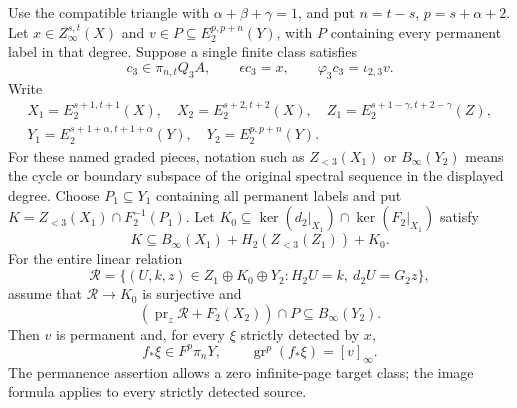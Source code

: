 \begin{corollary}
\label{sem:ProofTools:coverage-recursive-three-layer-permanent}
Use the compatible triangle with $\alpha+\beta+\gamma=1$, and put
$n=t-s$, $p=s+\alpha+2$.
Let $x\in Z_\infty^{s,t}(X)$ and
$v\in P\subseteq E_2^{p,p+n}(Y)$, with $P$ containing every
permanent label in that degree. Suppose a single finite class satisfies
\[
 c_3\in\pi_{n,t}Q_3A,\qquad \epsilon c_3=x,\qquad
 \varphi_3c_3=\iota_{2,3}v.
\]
Write
\[
\begin{gathered}
 X_1=E_2^{s+1,t+1}(X),\quad X_2=E_2^{s+2,t+2}(X),\quad
 Z_1=E_2^{s+1-\gamma,t+2-\gamma}(Z),\\
 Y_1=E_2^{s+1+\alpha,t+1+\alpha}(Y),\quad
 Y_2=E_2^{p,p+n}(Y).
\end{gathered}
\]
For these named graded pieces, notation such as $Z_{<3}(X_1)$ or
$B_\infty(Y_2)$ means the cycle or boundary subspace of the original
spectral sequence in the displayed degree.
Choose $P_1\subseteq Y_1$ containing all permanent labels and put
$K=Z_{<3}(X_1)\cap F_2^{-1}(P_1)$.
Let $K_0\subseteq\ker(d_2|_{X_1})\cap\ker(F_2|_{X_1})$ satisfy
\[
 K\subseteq B_\infty(X_1)+H_2(Z_{<3}(Z_1))+K_0.
\]
For the entire linear relation
\[
 \mathcal R=\{(U,k,z)\in Z_1\oplus K_0\oplus Y_2:
                  H_2U=k,\ d_2U=G_2z\},
\]
assume that $\mathcal R\to K_0$ is surjective and
\[
 (\operatorname{pr}_z\mathcal R+F_2(X_2))\cap P
 \subseteq B_\infty(Y_2).
\]
Then $v$ is permanent and, for every $\xi$ strictly detected by $x$,
\[
 f_*\xi\in F^p\pi_nY,\qquad
 \operatorname{gr}^{p}(f_*\xi)=[v]_\infty.
\]
The permanence assertion allows a zero infinite-page target class;
the image formula applies to every strictly detected source.
\end{corollary}
